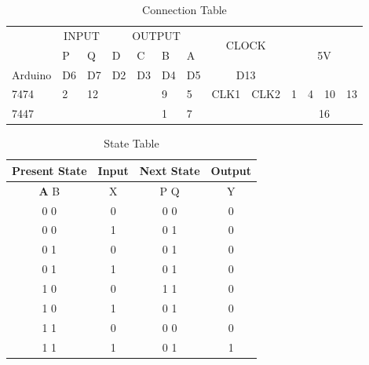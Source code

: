 \documentclass[journal,12pt,twocolumn]{IEEEtran}
\begin{document}
\centering
\begin{table}[h!]
\large
\begin{tabular}{|l|ll|llll|cl|clll|}
\hline
\multirow{2}{*}{} & \multicolumn{2}{c|}{INPUT}   & \multicolumn{4}{c|}{OUTPUT}                                                      & \multicolumn{2}{c|}{\multirow{2}{*}{CLOCK}} & \multicolumn{4}{c|}{\multirow{3}{*}{5V}}                                       \\ \cline{2-7}
                  & \multicolumn{1}{l|}{P}  & Q  & \multicolumn{1}{l|}{D}  & \multicolumn{1}{l|}{C}  & \multicolumn{1}{l|}{B}  & A  & \multicolumn{2}{c|}{}                       & \multicolumn{4}{c|}{}                                                          \\ \cline{1-9}
Arduino           & \multicolumn{1}{l|}{D6} & D7 & \multicolumn{1}{l|}{D2} & \multicolumn{1}{l|}{D3} & \multicolumn{1}{l|}{D4} & D5 & \multicolumn{2}{c|}{D13}                    & \multicolumn{4}{c|}{}                                                          \\ \hline
7474              & \multicolumn{1}{l|}{2}  & 12 & \multicolumn{1}{l|}{}   & \multicolumn{1}{l|}{}   & \multicolumn{1}{l|}{9}  & 5  & \multicolumn{1}{l|}{CLK1}       & CLK2      & \multicolumn{1}{l|}{1} & \multicolumn{1}{l|}{4} & \multicolumn{1}{l|}{10} & 13 \\ \hline
7447              & \multicolumn{1}{l|}{}   &    & \multicolumn{1}{l|}{}   & \multicolumn{1}{l|}{}   & \multicolumn{1}{l|}{1}  & 7  & \multicolumn{1}{l|}{}           &           & \multicolumn{4}{c|}{16}                                                        \\ \hline
\end{tabular}
\centering
\caption{Connection Table}
\label{table:2}
\end{table}

\begin{table}[h!]
\begin{tabular}{|c|c|c|c|}
\hline
\textbf Present State & Input & Next State & Output \\
\hline
\textbf A B & X & P Q & Y\\
\hline
0 0 & 0 & 0 0 & 0\\
0 0 & 1 & 0 1 & 0\\
0 1 & 0 & 0 1 & 0\\
0 1 & 1 & 0 1 & 0\\
1 0 & 0 & 1 1 & 0\\
1 0 & 1 & 0 1 & 0\\
1 1 & 0 & 0 0 & 0\\
1 1 & 1 & 0 1 & 1\\
\hline
\end{tabular}
\centering
\caption{State Table}
\label{table:2}
\end{table}
\end{document}
